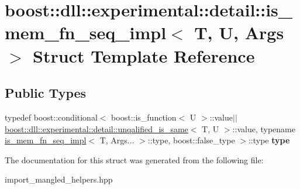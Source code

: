 \hypertarget{a01508}{}\section{boost\+:\+:dll\+:\+:experimental\+:\+:detail\+:\+:is\+\_\+mem\+\_\+fn\+\_\+seq\+\_\+impl$<$ T, U, Args $>$ Struct Template Reference}
\label{a01508}
\subsection*{Public Types}
\begin{DoxyCompactItemize}
\item 
\mbox{\label{a01508_a5b0ef01b378457cb1ffabfae4a1ed68f}} 
typedef boost\+::conditional$<$ boost\+::is\+\_\+function$<$ U $>$\+::value$\vert$$\vert$\hyperlink{a01444}{boost\+::dll\+::experimental\+::detail\+::unqalified\+\_\+is\+\_\+same}$<$ T, U $>$\+::value, typename \hyperlink{a01508}{is\+\_\+mem\+\_\+fn\+\_\+seq\+\_\+impl}$<$ T, Args... $>$\+::type, boost\+::false\+\_\+type $>$\+::type {\bfseries type}
\end{DoxyCompactItemize}


The documentation for this struct was generated from the following file\+:\begin{DoxyCompactItemize}
\item 
import\+\_\+mangled\+\_\+helpers.\+hpp\end{DoxyCompactItemize}
